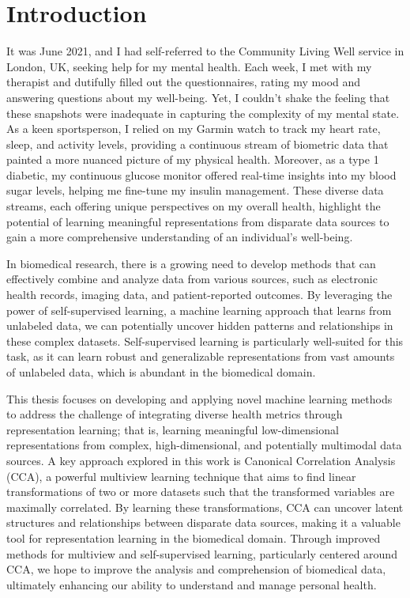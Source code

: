 \chapter{Introduction}\label{chap:introduction}
It was June 2021, and I had self-referred to the Community Living Well service in London, UK, seeking help for my mental health. Each week, I met with my therapist and dutifully filled out the questionnaires, rating my mood and answering questions about my well-being. Yet, I couldn't shake the feeling that these snapshots were inadequate in capturing the complexity of my mental state. As a keen sportsperson, I relied on my Garmin watch to track my heart rate, sleep, and activity levels, providing a continuous stream of biometric data that painted a more nuanced picture of my physical health. Moreover, as a type 1 diabetic, my continuous glucose monitor offered real-time insights into my blood sugar levels, helping me fine-tune my insulin management. These diverse data streams, each offering unique perspectives on my overall health, highlight the potential of learning meaningful representations from disparate data sources to gain a more comprehensive understanding of an individual's well-being.

In biomedical research, there is a growing need to develop methods that can effectively combine and analyze data from various sources, such as electronic health records, imaging data, and patient-reported outcomes. By leveraging the power of self-supervised learning, a machine learning approach that learns from unlabeled data, we can potentially uncover hidden patterns and relationships in these complex datasets. Self-supervised learning is particularly well-suited for this task, as it can learn robust and generalizable representations from vast amounts of unlabeled data, which is abundant in the biomedical domain.

This thesis focuses on developing and applying novel machine learning methods to address the challenge of integrating diverse health metrics through representation learning; that is, learning meaningful low-dimensional representations from complex, high-dimensional, and potentially multimodal data sources. 
A key approach explored in this work is Canonical Correlation Analysis (CCA), a powerful multiview learning technique that aims to find linear transformations of two or more datasets such that the transformed variables are maximally correlated. By learning these transformations, CCA can uncover latent structures and relationships between disparate data sources, making it a valuable tool for representation learning in the biomedical domain. Through improved methods for multiview and self-supervised learning, particularly centered around CCA, we hope to improve the analysis and comprehension of biomedical data, ultimately enhancing our ability to understand and manage personal health.

